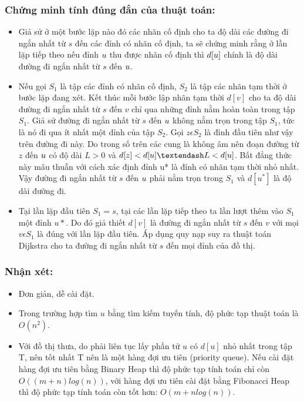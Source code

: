 \documentclass[a4paper,12pt]{report}
\begin{document}
    \subsubsection{Chứng minh tính đúng đắn của thuật toán:}
\begin{itemize}

	\item Giả sử ở một bước lặp nào đó các nhãn cố định cho ta độ dài các đường đi ngắn nhất từ $s$ đến các đỉnh có nhãn cố định, ta sẽ chứng minh rằng ở lần lặp tiếp theo nếu đỉnh $ u\* $ thu được nhãn cố định thì $ d[u\*] $ chính là độ dài đường đi ngắn nhất từ $s$ đến $ u\* $.
	\item Nếu gọi $ S_{1} $ là tập các đỉnh có nhãn cố định, $ S_{2} $ là tập các nhãn tạm thời ở bước lặp đang xét. Kết thúc mỗi bước lập nhãn tạm thời $ d[v] $ cho ta độ dài đường đi ngắn nhất từ $s$ đến $v$ chỉ qua những đỉnh nằm hoàn toàn trong tập $ S_{1} $. Giả sử đường đi ngắn nhất từ $s$ đến $ u\* $ không nằm trọn trong tập $ S_{1} $, tức là nó đi qua ít nhất một dỉnh của tập $ S_{2} $. Gọi $ z \epsilon S_{2} $ là đỉnh đầu tiên như vậy trên đường đi này. Do trong số trên các cung là không âm nên đoạn đường từ $z$ đến $ u\* $ có độ dài $ L>0 $ và $ d[z] < d[u\*] – L < d[u\*] $. Bất đẳng thức này mâu thuẫn với cách xác định đỉnh u* là đỉnh có nhãn tạm thời nhỏ nhất. Vậy đường đi ngắn nhất từ $s$ đến $ u\* $ phải nằm trọn trong $ S_{1} $ và $ d[u^{*}] $ là độ dài đường đi.
	\item Tại lần lặp đầu tiên $ S_{1} = {s} $, tại các lần lặp tiếp theo ta lần lượt thêm vào $ S_{1} $ một đỉnh $ u* $. Do đó giả thiết $ d[v] $ là đường đi ngắn nhất từ $s$ đến $v$ với mọi $ v \epsilon S_{1} $ là đúng với lần lặp đầu tiên. Áp dụng quy nạp suy ra thuật toán Dijkstra cho ta đường đi ngắn nhất từ $s$ đến mọi đỉnh của đồ thị.


\end{itemize}

    \subsubsection{Nhận xét:}
\begin{itemize}
	\item Đơn giản, dễ cài đặt.
	\item Trong trường hợp tìm $u$ bằng tìm kiếm tuyến tính, độ phức tạp thuật toán là $ O(n^{2}) $.
	\item Với đồ thị thưa, do phải liên tục lấy phần tử $u$ có $d[u]$ nhỏ nhất trong tập T,
            nên tốt nhất T nên là một hàng đợi ưu tiên (priority queue). Nếu
            cài đặt hàng đợi ưu tiên bằng Binary Heap thì độ phức tạp tính toán
            chỉ còn $O((m+n) log(n))$, với hàng đợi ưu tiên cài đặt bằng
            Fibonacci Heap thì độ phức tạp tính toán còn tốt hơn: $O(m + n
            log(n))$.

\end{itemize}
\end{document}
